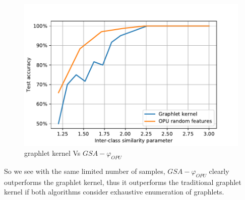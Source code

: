 \begin{figure}[H]
\centering
\includegraphics[scale=0.5]{figs/gk_vs_opu.pdf}
\caption[graphlet kernel Vs $GSA-\varphi_{OPU}$  ]{graphlet kernel Vs $GSA-\varphi_{OPU}$   }
\label{fig:gk_vs_opu}
\end{figure}
So we see with the same limited number of samples,  $GSA-\varphi_{OPU}$ clearly outperforms the graphlet kernel, thus it outperforms the traditional graphlet kernel if both algorithms consider exhaustive enumeration of graphlets. 

